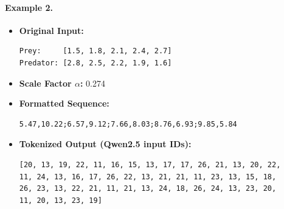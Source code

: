 \documentclass[a4paper,12pt]{article}
\begin{document}
\vspace{-1cm}

\paragraph{Example 2.}
\begin{itemize}
  \item \textbf{Original Input:}
  \begin{verbatim}
Prey:     [1.5, 1.8, 2.1, 2.4, 2.7]
Predator: [2.8, 2.5, 2.2, 1.9, 1.6]
  \end{verbatim}

  \vspace{-0.7cm}

  \item \textbf{Scale Factor $\alpha$:} 0.274

  \item \textbf{Formatted Sequence:}
  \begin{verbatim}
5.47,10.22;6.57,9.12;7.66,8.03;8.76,6.93;9.85,5.84
  \end{verbatim}

  \vspace{-0.7cm}

  \item \textbf{Tokenized Output (Qwen2.5 input IDs):}
  \begin{verbatim}
[20, 13, 19, 22, 11, 16, 15, 13, 17, 17, 26, 21, 13, 20, 22,
11, 24, 13, 16, 17, 26, 22, 13, 21, 21, 11, 23, 13, 15, 18,
26, 23, 13, 22, 21, 11, 21, 13, 24, 18, 26, 24, 13, 23, 20,
11, 20, 13, 23, 19]
  \end{verbatim}
\end{itemize}
\end{document}
